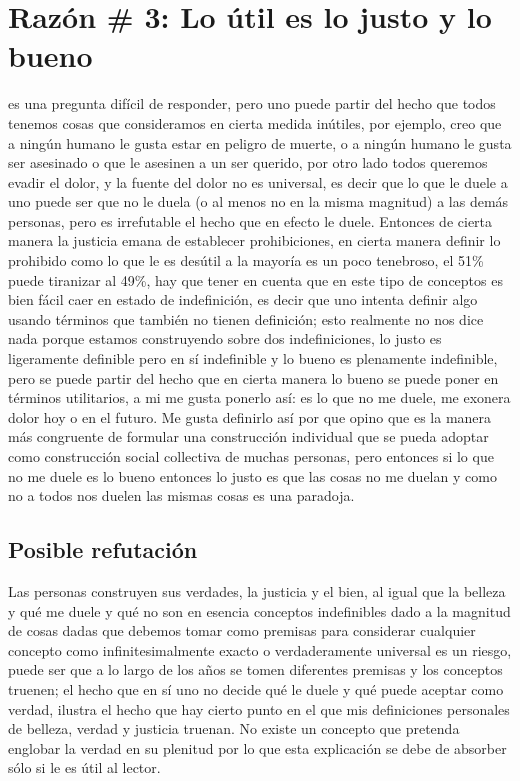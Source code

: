 \documentclass{article}
\begin{document}
\section{Razón \# 3: Lo útil es lo justo y lo bueno}
 es una pregunta difícil de responder, pero uno puede partir del hecho que todos tenemos cosas que consideramos en cierta medida inútiles, por ejemplo, creo que a ningún humano le gusta estar en peligro de muerte, o a ningún humano le gusta ser asesinado o que le asesinen a un ser querido, por otro lado todos queremos evadir el dolor, y la fuente del dolor no es universal, es decir que lo que le duele a uno puede ser que no le duela (o al menos no en la misma magnitud) a las demás personas, pero es irrefutable el hecho que en efecto le duele. Entonces de cierta manera la justicia emana de establecer prohibiciones, en cierta manera definir lo prohibido como lo que le es desútil a la mayoría es un poco tenebroso, el 51\% puede tiranizar al 49\%, hay que tener en cuenta que en este tipo de conceptos es bien fácil caer en estado de indefinición, es decir que uno intenta definir algo usando términos que también no tienen definición;  esto realmente no nos dice nada porque estamos construyendo sobre dos indefiniciones, lo justo es ligeramente definible pero en sí indefinible y lo bueno es plenamente indefinible, pero se puede partir del hecho que en cierta manera lo bueno se puede poner en términos utilitarios, a mi me gusta ponerlo así: es lo que no me duele, me exonera dolor hoy o en el futuro. 
Me gusta definirlo así por que opino que es la manera más congruente de formular una construcción individual que se pueda adoptar como construcción social collectiva de muchas personas, pero entonces si lo que no me duele es lo bueno entonces lo justo es que las cosas no me duelan y como no a todos nos duelen las mismas cosas es una paradoja. 

\subsection{Posible refutación}
Las personas construyen sus verdades, la justicia y el bien, al igual que la belleza y qué me duele y qué no son en esencia conceptos indefinibles dado a la magnitud de cosas dadas que debemos tomar como premisas para considerar cualquier concepto como infinitesimalmente exacto o verdaderamente universal es un riesgo, puede ser que a lo largo de los años se tomen diferentes premisas y los conceptos truenen; el hecho que en sí uno no decide qué le duele y qué puede aceptar como verdad, ilustra el hecho que hay cierto punto en el que mis definiciones personales de belleza, verdad y justicia truenan. No existe un concepto que pretenda englobar la verdad en su plenitud por lo que esta explicación se debe de absorber sólo si le es útil al lector.
\end{document}
